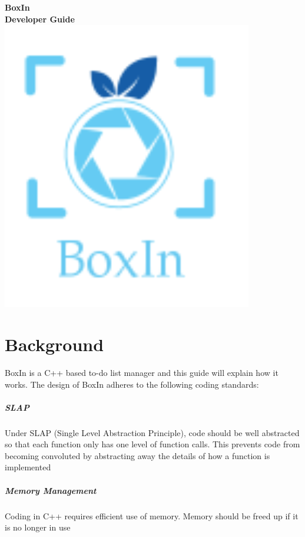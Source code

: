 \documentclass[12pt]{extarticle}
\begin{document}
\begin{center}
\bf \Huge BoxIn\\
Developer Guide
\includegraphics[width=\textwidth]{BoxIn}
\end{center}



\tableofcontents

\newpage
\section{Background}

BoxIn is a C++ based to-do list manager and this guide will explain how it works. The design of BoxIn adheres to the following coding standards:

\subparagraph{SLAP}    
Under SLAP (Single Level Abstraction Principle), code should be well abstracted so that each function only has one level of function calls. This prevents code from becoming convoluted by abstracting away the details of how a function is implemented

\subparagraph{Memory Management}
Coding in C++ requires efficient use of memory. Memory should be freed up if it is no longer in use
\end{document}
